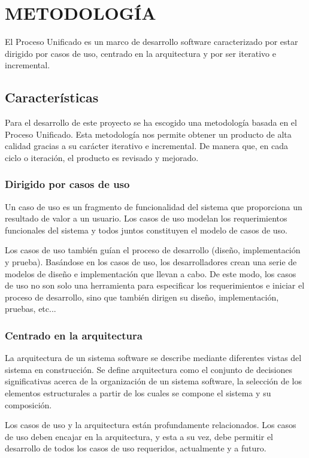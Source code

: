 \chapter[Metodología]{
  \label{chp:metodologia}
  METODOLOGÍA
}
\thispagestyle{numberingStyle}
\pagestyle{numberingStyle}

El Proceso Unificado es un marco de desarrollo software caracterizado por estar dirigido por casos de uso, centrado en la arquitectura y por ser iterativo e incremental.


\section{Características}

Para el desarrollo de este proyecto se ha escogido una metodología basada en el Proceso Unificado. Esta metodología nos permite obtener un producto de alta calidad gracias a su carácter iterativo e incremental. De manera que, en cada ciclo o iteración, el producto es revisado y mejorado.

\subsection{Dirigido por casos de uso}
Un caso de uso es un fragmento de funcionalidad del sistema que proporciona un resultado de valor a un usuario. Los casos de uso modelan los requerimientos funcionales del sistema y todos juntos constituyen el  modelo de casos de uso.

Los casos de uso también guían el proceso de desarrollo (diseño, implementación y prueba). Basándose en los casos de uso, los desarrolladores crean una serie de modelos de diseño e implementación que llevan a cabo. De este modo, los casos de uso no son solo una herramienta para especificar los requerimientos e iniciar el proceso de desarrollo, sino que también dirigen su diseño, implementación, pruebas, etc...

\subsection{Centrado en la arquitectura}
La arquitectura de un sistema software se describe mediante diferentes vistas del sistema en construcción. Se define arquitectura como el conjunto de decisiones significativas acerca de la organización de un sistema software, la selección de los elementos estructurales a partir de los cuales se compone el sistema y su composición.

Los casos de uso y la arquitectura están profundamente relacionados. Los casos de uso deben encajar en la arquitectura, y esta a su vez, debe permitir el desarrollo de todos los casos de uso requeridos, actualmente y a futuro.

